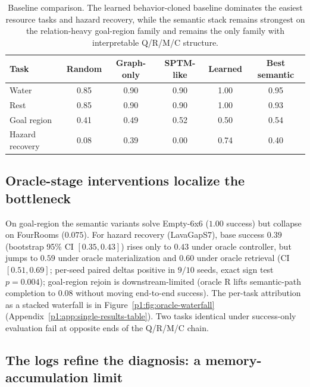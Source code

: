 \documentclass{article}
\begin{document}
\begin{table}[t]
  \caption{Baseline comparison. The learned behavior-cloned baseline dominates the easiest resource tasks and hazard recovery, while the semantic stack remains strongest on the relation-heavy goal-region family and remains the only family with interpretable Q/R/M/C structure.}
  \label{p1:tab:baselines}
  \centering
  \small
  \begin{tabular}{p{1.9cm}c c c c c}
    \toprule
    Task & Random & Graph-only & SPTM-like & Learned & Best semantic \\
    \midrule
    Water & 0.85 & 0.90 & 0.90 & 1.00 & 0.95 \\
    Rest & 0.85 & 0.90 & 0.90 & 1.00 & 0.93 \\
    Goal region & 0.41 & 0.49 & 0.52 & 0.50 & 0.54 \\
    Hazard recovery & 0.08 & 0.39 & 0.00 & 0.74 & 0.40 \\
    \bottomrule
  \end{tabular}
\end{table}

\subsection{Oracle-stage interventions localize the bottleneck}
\label{p1:sec:oracle}

On goal-region the semantic variants solve Empty-6x6 ($1.00$ success) but collapse on FourRooms ($0.075$). For hazard recovery (LavaGapS7), base success $0.39$ (bootstrap 95\% CI $[0.35,0.43]$) rises only to $0.43$ under oracle controller, but jumps to $0.59$ under oracle materialization and $0.60$ under oracle retrieval (CI $[0.51,0.69]$; per-seed paired deltas positive in $9/10$ seeds, exact sign test $p{=}0.004$); goal-region rejoin is downstream-limited (oracle R lifts semantic-path completion to $0.08$ without moving end-to-end success). The per-task attribution as a stacked waterfall is in Figure~\ref{p1:fig:oracle-waterfall} (Appendix~\ref{p1:app:single-results-table}). Two tasks identical under success-only evaluation fail at opposite ends of the Q/R/M/C chain.

\subsection{The logs refine the diagnosis: a memory-accumulation limit}
\label{p1:sec:refined-attribution}
\end{document}
